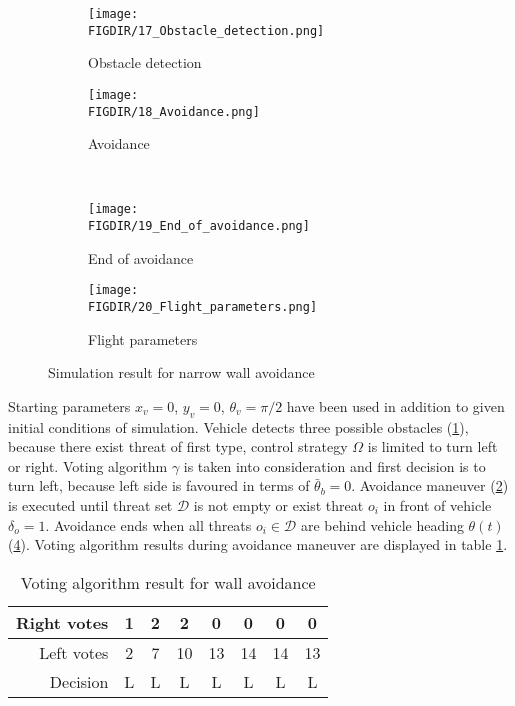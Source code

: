 \begin{figure}[H]
    \begin{subfigure}{0.5\textwidth}
    \texttt{[image: \\FIGDIR/17\_Obstacle\_detection.png]} 
    \caption{Obstacle detection}
    \label{fig:17Obstacledetection}
    \end{subfigure}
    \begin{subfigure}{0.5\textwidth}
    \texttt{[image: \\FIGDIR/18\_Avoidance.png]}
    \caption{Avoidance}
    \label{fig:18Avoidance}
    \end{subfigure}
    \\
    \begin{subfigure}{0.5\textwidth}
    \texttt{[image: \\FIGDIR/19\_End\_of\_avoidance.png]} 
    \caption{End of avoidance}
    \label{fig:19Endofavoidance}
    \end{subfigure}
    \begin{subfigure}{0.5\textwidth}
    \texttt{[image: \\FIGDIR/20\_Flight\_parameters.png]}
    \caption{Flight parameters}
    \label{fig:20Flightparameters}
    \end{subfigure}
\caption{Simulation result for narrow wall avoidance}
\label{fig:SimulationNarrowWall}
\end{figure}
Starting parameters $x_v = 0$, $y_v = 0$, $\theta_v = \pi/2$ have been used in addition to given initial conditions of simulation. Vehicle detects three possible obstacles (\ref{fig:17Obstacledetection}), because there exist threat of first type, control strategy $\Omega$ is limited to turn left or right. Voting algorithm $\gamma$ is taken into consideration and first decision is to turn left, because left side is favoured in terms of $\bar{\theta}_b=0$. Avoidance maneuver (\ref{fig:18Avoidance}) is executed until threat set $\mathscr{D}$ is not empty or exist threat $o_i$ in front of vehicle $\delta_o=1$. Avoidance ends when all threats $o_i\in\mathscr{D}$ are behind vehicle heading $\theta(t)$ (\ref{fig:20Flightparameters}). Voting algorithm results during avoidance maneuver are displayed in table \ref{tab:avoidancestraight}.

\begin{table}[H]
    \centering
    \begin{tabular}{|r||c|c|c|c|c|c|c|}
        \hline
        Right votes& 1 & 2 & 2  & 0  & 0  & 0  & 0 \\
        \hline
        Left votes & 2 & 7 & 10 & 13 & 14 & 14 & 13\\
        \hline
        \hline
        Decision   & L & L & L & L & L & L & L\\
        \hline
    \end{tabular}
    \caption{Voting algorithm result for wall avoidance}
    \label{tab:avoidancestraight}
\end{table}
    

